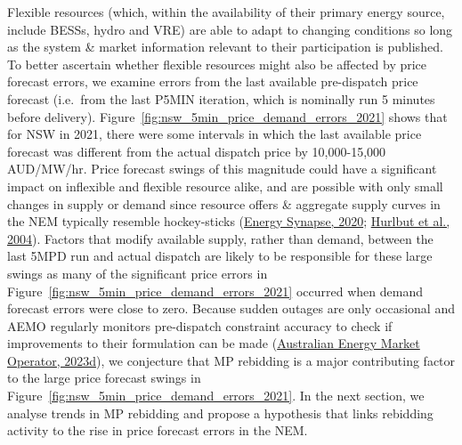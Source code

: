 \documentclass[12pt,a4paper,]{report}
\begin{document}
Flexible resources (which, within the availability of their primary
energy source, include BESSs, hydro and VRE) are able to adapt to
changing conditions so long as the system \& market information relevant
to their participation is published. To better ascertain whether
flexible resources might also be affected by price forecast errors, we
examine errors from the last available pre-dispatch price forecast
(i.e.~from the last P5MIN iteration, which is nominally run 5 minutes
before delivery). Figure~\ref{fig:nsw_5min_price_demand_errors_2021}
shows that for NSW in 2021, there were some intervals in which the last
available price forecast was different from the actual dispatch price by
10,000-15,000 AUD/MW/hr. Price forecast swings of this magnitude could
have a significant impact on inflexible and flexible resource alike, and
are possible with only small changes in supply or demand since resource
offers \& aggregate supply curves in the NEM typically resemble
hockey-sticks
(\protect\hyperlink{ref-energysynapseDemandResponseNational2020}{Energy
Synapse, 2020};
\protect\hyperlink{ref-hurlbutProtectingMarketHockey2004}{Hurlbut et
al., 2004}). Factors that modify available supply, rather than demand,
between the last 5MPD run and actual dispatch are likely to be
responsible for these large swings as many of the significant price
errors in Figure~\ref{fig:nsw_5min_price_demand_errors_2021} occurred
when demand forecast errors were close to zero. Because sudden outages
are only occasional and AEMO regularly monitors pre-dispatch constraint
accuracy to check if improvements to their formulation can be made
(\protect\hyperlink{ref-australianenergymarketoperatorMonthlyConstraintReport2023}{Australian
Energy Market Operator, 2023d}), we conjecture that MP rebidding is a
major contributing factor to the large price forecast swings in
Figure~\ref{fig:nsw_5min_price_demand_errors_2021}. In the next section,
we analyse trends in MP rebidding and propose a hypothesis that links
rebidding activity to the rise in price forecast errors in the NEM.
\end{document}

